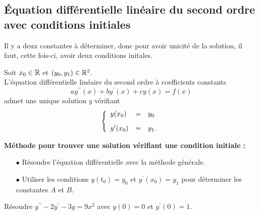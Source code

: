 \documentclass[a4paper, 11pt]{article}
\begin{document}
\subsection{\'Equation diff\'erentielle lin\'eaire du second ordre avec conditions initiales}

\noindent Il y a deux constantes \`a d\'eterminer, donc pour avoir unicit\'e de la solution, il faut, cette fois-ci, avoir deux conditions initales.\vsec

\begin{prop}
  Soit $x_0\in \mathbb{R}$ et $(y_0,y_1)\in\mathbb{R}^2$.\\
  \noindent L'\'equation diff\'erentielle lin\'eaire du second ordre \`a coefficients constants $$ay^{\prime\prime}(x)+by^{\prime}(x)+cy(x)=f(x)$$ admet une unique solution $y$ v\'erifiant
  $$\left\lbrace\begin{array}{lll}
      y(x_0)          & = & y_0\vsec \\
      y^{\prime}(x_0) & = & y_1.
    \end{array}\right.$$
\end{prop}


\begin{minipage}{0.9\textwidth}
  \begin{tcolorbox}[colback=red!5!white,colframe=red!75!black]
    \textbf{M\'ethode pour trouver une solution v\'erifiant une condition initiale :}
    \begin{itemize}
      \item[$\bullet$] R\'esoudre l'\'equation diff\'erentielle avec la m\'ethode g\'en\'erale.
      \item[$\bullet$] Utiliser les conditions $y(t_0) = y_0$ et $y^{\prime}(x_0)=y_1$ pour d\'eterminer les constantes $A$ et $B$.
    \end{itemize}

  \end{tcolorbox}
\end{minipage}

\begin{exercice}
  R\'esoudre $y^{\prime\prime}-2y^{\prime}-3y = 9x^2$ avec $y(0)=0$ et $y^{\prime}(0)=1$.
\end{exercice}
\end{document}
